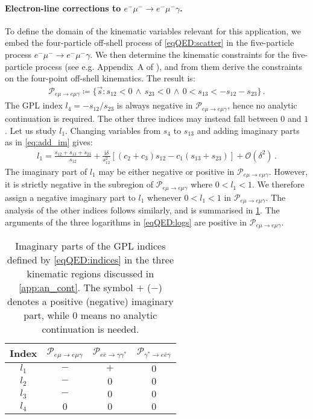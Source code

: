 \documentclass[main.tex]{subfiles}
\begin{document}
\smallskip

\paragraph{Electron-line corrections to $e^- \mu^- \to e^- \mu^- \gamma$.}
To define the domain of the kinematic variables relevant for this application, 
we embed the four-particle off-shell process of \cref{eqQED:scatter} in the five-particle process $e^- \mu^- \to e^- \mu^- \gamma$. We then determine the kinematic constraints for the five-particle process (see e.g. Appendix~A of ), and from them derive the constraints on the four-point off-shell kinematics. The result is:
\begin{align}
\label{eq:region_emu-emugamma}
\mathcal{P}_{e\mu\to{e}\mu\gamma} \coloneqq \{\vec{s} \colon s_{12} < 0 \, \land \, s_{23} < 0 \, \land \, 0 < s_{13} < -s_{12} - s_{23} \} \,.
\end{align}
The GPL index $l_4 = - s_{12}/s_{23}$ is always negative in $\mathcal{P}_{{e}\mu\to{e}\mu\gamma}$, hence no analytic continuation is required. The other three indices may instead fall between $0$ and $1$. Let us study $l_1$. Changing variables from $s_4$ to $s_{13}$ and adding imaginary parts as in \cref{eq:add_im} gives:
\begin{align}
l_1 = \frac{s_{12} + s_{13} + s_{23}}{s_{12}} +  \frac{\mathrm{i} \delta}{s_{12}^2} \left[ (c_2 + c_3) s_{12} - c_1 (s_{13} + s_{23}) \right] + \mathcal{O}\left(\delta^2\right) \,.
\end{align}
The imaginary part of $l_1$ may be either negative or positive in $\mathcal{P}_{{e}\mu\to{e}\mu\gamma} $. However, it is strictly negative in the subregion of $\mathcal{P}_{{e}\mu\to{e}\mu\gamma} $ where $0<l_1<1$. We therefore assign a negative imaginary part to $l_1$ whenever $0<l_1<1$ in $\mathcal{P}_{{e}\mu\to{e}\mu\gamma} $. The analysis of the other indices follows similarly, and is summarised in \cref{tab:an_cont}.
The arguments of the three logarithms in \cref{eqQED:logs} are positive in $\mathcal{P}_{e\mu\to{e}\mu\gamma}$.

\begin{table}
    \centering
    \begin{tabular}{cccc}
        \hline
        Index & $\mathcal{P}_{{e}\mu\to{e}\mu\gamma}$ & $\mathcal{P}_{{e}\bar{{e}}\to\gamma \gamma^*}$ & $\mathcal{P}_{\gamma^*\to e \bar{e} \gamma}$  \\
        \hline
        $l_1$  & $-$ & $+$ & $0$ \\
        $l_2$  & $-$ & $0$ & $0$ \\
        $l_3$  & $-$ & $0$ & $0$ \\
        $l_4$  & $0$ & $0$ & $0$ \\
        \hline
    \end{tabular}
    \caption{Imaginary parts of the GPL indices defined by \cref{eqQED:indices} in the three kinematic regions discussed in \cref{app:an_cont}. The symbol $+$ ($-$) denotes a positive (negative) imaginary part, while $0$ means no analytic continuation is needed.}
    \label{tab:an_cont}
\end{table}
\end{document}
